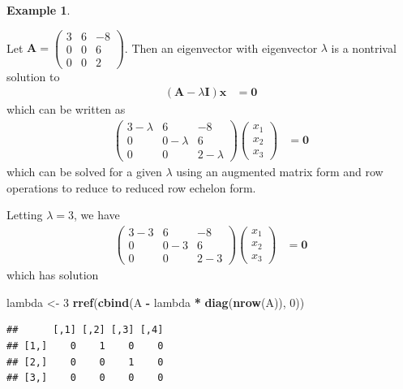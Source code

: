 \documentclass[
]{book}
\newenvironment{Shaded}{\begin{snugshade}}{\end{snugshade}}
\newcommand{\DecValTok}[1]{\textcolor[rgb]{0.00,0.00,0.81}{#1}}
\newcommand{\KeywordTok}[1]{\textcolor[rgb]{0.13,0.29,0.53}{\textbf{#1}}}
\newcommand{\NormalTok}[1]{#1}
\newcommand{\OperatorTok}[1]{\textcolor[rgb]{0.81,0.36,0.00}{\textbf{#1}}}
\newcommand{\StringTok}[1]{\textcolor[rgb]{0.31,0.60,0.02}{#1}}
\theoremstyle{definition}
\theoremstyle{definition}
\newtheorem{example}{Example}[chapter]
\theoremstyle{definition}
\theoremstyle{remark}
\begin{document}
\begin{example}
\protect\hypertarget{exm:unlabeled-div-162}{}\label{exm:unlabeled-div-162}

Let \(\mathbf{A} = \begin{pmatrix} 3 & 6 & -8 \\ 0 & 0 & 6 \\ 0 & 0 & 2 \end{pmatrix}\). Then an eigenvector with eigenvector \(\lambda\) is a nontrival solution to
\[
\begin{aligned}
\left( \mathbf{A} - \lambda \mathbf{I} \right) \mathbf{x} & = \mathbf{0}
\end{aligned}
\]
which can be written as
\[
\begin{aligned}
\begin{pmatrix} 
3  - \lambda & 6 & -8 \\
0 & 0 - \lambda & 6 \\
0 & 0 & 2 - \lambda
\end{pmatrix} \begin{pmatrix} x_1 \\ x_2 \\ x_3 \end{pmatrix} & = \mathbf{0}
\end{aligned}
\]
which can be solved for a given \(\lambda\) using an augmented matrix form and row operations to reduce to reduced row echelon form.

Letting \(\lambda = 3\), we have
\[
\begin{aligned}
\begin{pmatrix} 
3  - 3 & 6 & -8 \\
0 & 0 - 3 & 6 \\
0 & 0 & 2 - 3
\end{pmatrix} \begin{pmatrix} x_1 \\ x_2 \\ x_3 \end{pmatrix} & = \mathbf{0}
\end{aligned}
\]
which has solution

\begin{Shaded}
\begin{Highlighting}[]
\NormalTok{lambda <-}\StringTok{ }\DecValTok{3}
\KeywordTok{rref}\NormalTok{(}\KeywordTok{cbind}\NormalTok{(A }\OperatorTok{-}\StringTok{ }\NormalTok{lambda }\OperatorTok{*}\StringTok{ }\KeywordTok{diag}\NormalTok{(}\KeywordTok{nrow}\NormalTok{(A)), }\DecValTok{0}\NormalTok{))}
\end{Highlighting}
\end{Shaded}

\begin{verbatim}
##      [,1] [,2] [,3] [,4]
## [1,]    0    1    0    0
## [2,]    0    0    1    0
## [3,]    0    0    0    0
\end{verbatim}

\end{example}
\end{document}
